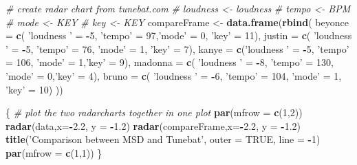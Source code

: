 \documentclass[]{article}
\newenvironment{Shaded}{\begin{snugshade}}{\end{snugshade}}
\newcommand{\KeywordTok}[1]{\textcolor[rgb]{0.13,0.29,0.53}{\textbf{#1}}}
\newcommand{\DataTypeTok}[1]{\textcolor[rgb]{0.13,0.29,0.53}{#1}}
\newcommand{\DecValTok}[1]{\textcolor[rgb]{0.00,0.00,0.81}{#1}}
\newcommand{\FloatTok}[1]{\textcolor[rgb]{0.00,0.00,0.81}{#1}}
\newcommand{\StringTok}[1]{\textcolor[rgb]{0.31,0.60,0.02}{#1}}
\newcommand{\CommentTok}[1]{\textcolor[rgb]{0.56,0.35,0.01}{\textit{#1}}}
\newcommand{\OtherTok}[1]{\textcolor[rgb]{0.56,0.35,0.01}{#1}}
\newcommand{\OperatorTok}[1]{\textcolor[rgb]{0.81,0.36,0.00}{\textbf{#1}}}
\newcommand{\NormalTok}[1]{#1}
\begin{document}
\begin{Shaded}
\begin{Highlighting}[]
\CommentTok{# create radar chart from tunebat.com }
\CommentTok{# loudness <- loudness}
\CommentTok{# tempo <- BPM}
\CommentTok{# mode <- KEY}
\CommentTok{# key <- KEY}
\NormalTok{compareFrame <-}\StringTok{ }\KeywordTok{data.frame}\NormalTok{(}\KeywordTok{rbind}\NormalTok{(}
  \DataTypeTok{beyonce =} \KeywordTok{c}\NormalTok{( }\StringTok{'loudness '}\NormalTok{ =}\StringTok{ }\OperatorTok{-}\DecValTok{5}\NormalTok{, }\StringTok{'tempo'}\NormalTok{ =}\StringTok{ }\DecValTok{97}\NormalTok{,}\StringTok{'mode'}\NormalTok{ =}\StringTok{ }\DecValTok{0}\NormalTok{, }\StringTok{'key'}\NormalTok{ =}\StringTok{ }\DecValTok{11}\NormalTok{),}
  \DataTypeTok{justin =} \KeywordTok{c}\NormalTok{( }\StringTok{'loudness '}\NormalTok{ =}\StringTok{ }\OperatorTok{-}\DecValTok{5}\NormalTok{, }\StringTok{'tempo'}\NormalTok{ =}\StringTok{ }\DecValTok{76}\NormalTok{, }\StringTok{'mode'}\NormalTok{ =}\StringTok{ }\DecValTok{1}\NormalTok{, }\StringTok{'key'}\NormalTok{ =}\StringTok{ }\DecValTok{7}\NormalTok{),}
  \DataTypeTok{kanye =} \KeywordTok{c}\NormalTok{(}\StringTok{'loudness '}\NormalTok{ =}\StringTok{ }\OperatorTok{-}\DecValTok{5}\NormalTok{, }\StringTok{'tempo'}\NormalTok{ =}\StringTok{ }\DecValTok{106}\NormalTok{, }\StringTok{'mode'}\NormalTok{ =}\StringTok{ }\DecValTok{1}\NormalTok{,}\StringTok{'key'}\NormalTok{ =}\StringTok{ }\DecValTok{9}\NormalTok{),}
  \DataTypeTok{madonna =} \KeywordTok{c}\NormalTok{( }\StringTok{'loudness '}\NormalTok{ =}\StringTok{ }\OperatorTok{-}\DecValTok{8}\NormalTok{, }\StringTok{'tempo'}\NormalTok{ =}\StringTok{ }\DecValTok{130}\NormalTok{, }\StringTok{'mode'}\NormalTok{ =}\StringTok{ }\DecValTok{0}\NormalTok{,}\StringTok{'key'}\NormalTok{ =}\StringTok{ }\DecValTok{4}\NormalTok{),}
  \DataTypeTok{bruno =} \KeywordTok{c}\NormalTok{( }\StringTok{'loudness '}\NormalTok{ =}\StringTok{ }\OperatorTok{-}\DecValTok{6}\NormalTok{, }\StringTok{'tempo'}\NormalTok{ =}\StringTok{ }\DecValTok{104}\NormalTok{, }\StringTok{'mode'}\NormalTok{ =}\StringTok{ }\DecValTok{1}\NormalTok{, }\StringTok{'key'}\NormalTok{ =}\StringTok{ }\DecValTok{10}\NormalTok{)}
\NormalTok{))}

\NormalTok{\{}
\CommentTok{# plot the two radarcharts together in one plot}
\KeywordTok{par}\NormalTok{(}\DataTypeTok{mfrow =} \KeywordTok{c}\NormalTok{(}\DecValTok{1}\NormalTok{,}\DecValTok{2}\NormalTok{))}
\KeywordTok{radar}\NormalTok{(data,}\DataTypeTok{x=}\OperatorTok{-}\FloatTok{2.2}\NormalTok{, }\DataTypeTok{y =} \OperatorTok{-}\FloatTok{1.2}\NormalTok{)}
\KeywordTok{radar}\NormalTok{(compareFrame,}\DataTypeTok{x=}\OperatorTok{-}\FloatTok{2.2}\NormalTok{,  }\DataTypeTok{y =} \OperatorTok{-}\FloatTok{1.2}\NormalTok{)}
\KeywordTok{title}\NormalTok{(}\StringTok{'Comparison between MSD and Tunebat'}\NormalTok{, }\DataTypeTok{outer =} \OtherTok{TRUE}\NormalTok{, }\DataTypeTok{line =} \OperatorTok{-}\DecValTok{1}\NormalTok{)}
\KeywordTok{par}\NormalTok{(}\DataTypeTok{mfrow =} \KeywordTok{c}\NormalTok{(}\DecValTok{1}\NormalTok{,}\DecValTok{1}\NormalTok{))}
\NormalTok{\}}
\end{Highlighting}
\end{Shaded}
\end{document}
